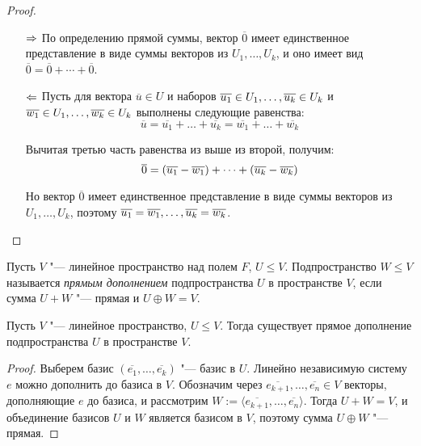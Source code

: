     \begin{proof}~
    	\begin{itemize}
    		\item[$\Rightarrow$]По определению прямой суммы, вектор $\overline{0}$ имеет единственное представление в виде суммы векторов из $U_1, \dotsc, U_k$, и оно имеет вид $\overline{0} = \overline{0} + \dotsb + \overline{0}$.
    		
    		\item[$\Leftarrow$]Пусть для вектора $\overline{u} \in U$ и наборов $\overline{u_1} \in U_1, \dots, \overline{u_k} \hm{\in} U_k$ и $\overline{w_1} \in U_1, \dots, \overline{w_k} \hm{\in} U_k$ выполнены следующие равенства:
    		\[\overline{u} = \overline{u_1} + \dots + \overline{u_k} = \overline{w_1} + \dots + \overline{w_k}\]
    		
    		Вычитая третью часть равенства из выше из второй, получим:
    		\[\overline{0} = (\overline{u_1} - \overline{w_1}) \hm{+} \dots + (\overline{u_k} - \overline{w_k})\]
    		
    		Но вектор $\overline{0}$ имеет единственное представление в виде суммы векторов из $U_1, \dotsc, U_k$, поэтому $\overline{u_1} = \overline{w_1}, \dots, \overline{u_k} \hm{=} \overline{w_k}$.\qedhere
    	\end{itemize}
    \end{proof}
    
    \begin{definition}
    	Пусть $V$ "--- линейное пространство над полем $F$, $U \le V$. Подпространство $W \le V$ называется \textit{прямым дополнением} подпространства $U$ в пространстве $V$, если сумма $U + W$ "--- прямая и $U \oplus W = V$.
    \end{definition}
    
    \begin{proposition}
    	Пусть $V$ "--- линейное пространство, $U \le V$. Тогда существует прямое дополнение подпространства $U$ в пространстве $V$.
    \end{proposition}
    
    \begin{proof}
    	Выберем базис $(\overline{e_1}, \dots, \overline{e_k})$ "--- базис в $U$. Линейно независимую систему $e$ можно дополнить до базиса в $V$. Обозначим через $\overline{e_{k+1}}, \dots, \overline{e_n} \in V$ векторы, дополняющие $e$ до базиса, и рассмотрим $W := \langle \overline{e_{k+1}}, \dots, \overline{e_n}\rangle$. Тогда $U + W = V$, и объединение базисов $U$ и $W$ является базисом в $V$, поэтому сумма $U \oplus W$ "--- прямая.
    \end{proof}
    
